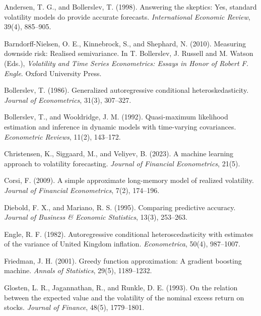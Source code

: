 \documentclass[11pt]{article}
\begin{document}
\begin{list}{}{\setlength{\leftmargin}{1.5em}\setlength{\itemindent}{-1.5em}\setlength{\itemsep}{2pt}\setlength{\parsep}{0pt}}

\item Andersen, T. G., and Bollerslev, T. (1998). Answering the skeptics: Yes,
standard volatility models do provide accurate forecasts. \emph{International
Economic Review}, 39(4), 885--905.

\item Barndorff-Nielsen, O. E., Kinnebrock, S., and Shephard, N. (2010).
Measuring downside risk: Realised semivariance. In T. Bollerslev, J.
Russell and M. Watson (Eds.), \emph{Volatility and Time Series Econometrics:
Essays in Honor of Robert F. Engle}. Oxford University Press.

\item Bollerslev, T. (1986). Generalized autoregressive conditional
heteroskedasticity. \emph{Journal of Econometrics}, 31(3), 307--327.

\item Bollerslev, T., and Wooldridge, J. M. (1992). Quasi-maximum likelihood
estimation and inference in dynamic models with time-varying covariances.
\emph{Econometric Reviews}, 11(2), 143--172.

\item Christensen, K., Siggaard, M., and Veliyev, B. (2023). A machine learning
approach to volatility forecasting. \emph{Journal of Financial Econometrics},
21(5).

\item Corsi, F. (2009). A simple approximate long-memory model of realized
volatility. \emph{Journal of Financial Econometrics}, 7(2), 174--196.

\item Diebold, F. X., and Mariano, R. S. (1995). Comparing predictive accuracy.
\emph{Journal of Business \& Economic Statistics}, 13(3), 253--263.

\item Engle, R. F. (1982). Autoregressive conditional heteroscedasticity with
estimates of the variance of United Kingdom inflation. \emph{Econometrica},
50(4), 987--1007.

\item Friedman, J. H. (2001). Greedy function approximation: A gradient boosting
machine. \emph{Annals of Statistics}, 29(5), 1189--1232.

\item Glosten, L. R., Jagannathan, R., and Runkle, D. E. (1993). On the relation
between the expected value and the volatility of the nominal excess return
on stocks. \emph{Journal of Finance}, 48(5), 1779--1801.


\end{list}
\end{document}

